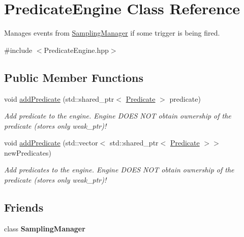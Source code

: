\hypertarget{classPredicateEngine}{}\section{Predicate\+Engine Class Reference}
\label{classPredicateEngine}


Manages events from \hyperlink{classSamplingManager}{Sampling\+Manager} if some trigger is being fired.  




{\ttfamily \#include $<$Predicate\+Engine.\+hpp$>$}

\subsection*{Public Member Functions}
\begin{DoxyCompactItemize}
\item 
void \hyperlink{classPredicateEngine_a93d9a2cb4563c844b8877973fd9ba7d2}{add\+Predicate} (std\+::shared\+\_\+ptr$<$ \hyperlink{classPredicate}{Predicate} $>$ predicate)\hypertarget{classPredicateEngine_a93d9a2cb4563c844b8877973fd9ba7d2}{}\label{classPredicateEngine_a93d9a2cb4563c844b8877973fd9ba7d2}

\begin{DoxyCompactList}\small\item\em Add predicate to the engine. Engine D\+O\+ES N\+OT obtain ownership of the predicate (stores only weak\+\_\+ptr)! \end{DoxyCompactList}\item 
void \hyperlink{classPredicateEngine_af2618d6900a69779eec1ea0d14544837}{add\+Predicate} (std\+::vector$<$ std\+::shared\+\_\+ptr$<$ \hyperlink{classPredicate}{Predicate} $>$$>$ new\+Predicates)\hypertarget{classPredicateEngine_af2618d6900a69779eec1ea0d14544837}{}\label{classPredicateEngine_af2618d6900a69779eec1ea0d14544837}

\begin{DoxyCompactList}\small\item\em Add predicates to the engine. Engine D\+O\+ES N\+OT obtain ownership of the predicate (stores only weak\+\_\+ptr)! \end{DoxyCompactList}\end{DoxyCompactItemize}
\subsection*{Friends}
\begin{DoxyCompactItemize}
\item 
class {\bfseries Sampling\+Manager}\hypertarget{classPredicateEngine_a6d16c0a872d35824571b872963e07b6e}{}\label{classPredicateEngine_a6d16c0a872d35824571b872963e07b6e}

\end{DoxyCompactItemize}



